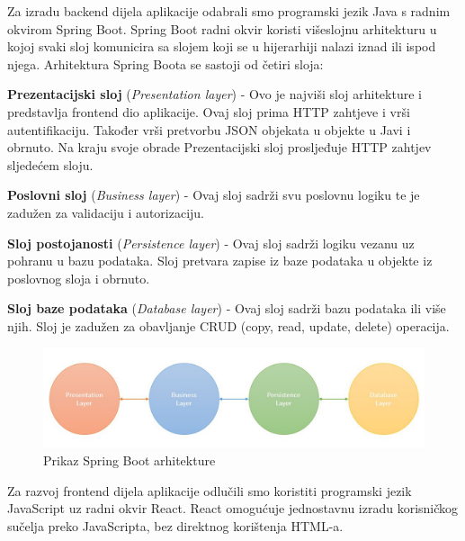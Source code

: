 		Za izradu backend dijela aplikacije odabrali smo programski jezik Java s radnim okvirom Spring Boot. Spring Boot radni okvir koristi višeslojnu arhitekturu u kojoj svaki sloj komunicira sa slojem koji se u hijerarhiji nalazi iznad ili ispod njega. Arhitektura Spring Boota se sastoji od četiri sloja:
		\begin{packed_item}
			\item \textbf{Prezentacijski sloj} (\textit{Presentation layer}) - Ovo je najviši sloj arhitekture i predstavlja frontend dio aplikacije. Ovaj sloj prima HTTP zahtjeve i vrši autentifikaciju. Također vrši pretvorbu JSON objekata u objekte u Javi i obrnuto. Na kraju svoje obrade Prezentacijski sloj prosljeđuje HTTP zahtjev sljedećem sloju.
			
			\item \textbf{Poslovni sloj} (\textit{Business layer}) - Ovaj sloj sadrži svu poslovnu logiku te je zadužen za validaciju i autorizaciju.
			
			\item \textbf{Sloj postojanosti} (\textit{Persistence layer}) - Ovaj sloj sadrži logiku vezanu uz pohranu u bazu podataka. Sloj pretvara zapise iz baze podataka u objekte iz poslovnog sloja i obrnuto.
			
			\item \textbf{Sloj baze podataka} (\textit{Database layer}) - Ovaj sloj sadrži bazu podataka ili više njih. Sloj je zadužen za obavljanje CRUD (copy, read, update, delete) operacija.
		\end{packed_item}
		
		\begin{figure}[H]
			\includegraphics[width=\textwidth]{slike/slojeviArhitekture.jpg} %
			\caption{Prikaz Spring Boot arhitekture}
			\label{fig:SpringBootArh} %
		\end{figure}
		
		Za razvoj frontend dijela aplikacije odlučili smo koristiti programski jezik JavaScript uz radni okvir React. React omogućuje jednostavnu izradu korisničkog sučelja preko JavaScripta, bez direktnog korištenja HTML-a.
		
